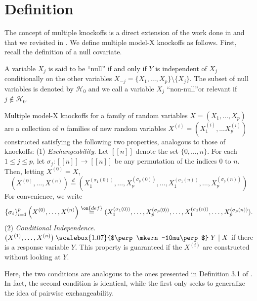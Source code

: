 \documentclass[11pt,reqno]{report}
\theoremstyle{definition}
\newcommand{\indep}{\mathrel{\text{\scalebox{1.07}{$\perp\mkern-10mu\perp$}}}}
\numberwithin{equation}{section}
\begin{document}
\section{Definition}
The concept of multiple knockoffs is a direct extension of the work done in \cite{knockoffs} and \cite{panning} that we revisited in . We define multiple model-X knockoffs as follows. First, recall the definition of a null covariate.
\begin{defn}
A variable $X_j$ is said to be ``null'' if and only if $Y$ is independent of $X_j$ conditionally on the other variables $X_{-j} = \{ X_1, \ldots, X_p \} \setminus \{ X_j\}$. The subset of null variables is denoted by $\mathcal{H}_0$ and we call a variable $X_j$ ``non-null''or relevant if $j \not \in \mathcal{H}_0$.
\end{defn}
\begin{defn}
Multiple model-X knockoffs for a family of random variables $X = (X_1, \ldots, X_p)$ are a collection of $n$ families of new random variables $X^{(i)} = (X^{(i)}_1, \ldots X^{(i)}_p)$ constructed satisfying the following two properties, analogous to those of knockoffs: (1) \emph{Exchangeability.} Let $[[n]]$ denote the set $\{ 0, \ldots, n \}$. For each $1 \leq j \leq p$, let $\sigma_j : [[n]] \to [[n]]$ be any permutation of the indices $0$ to $n$. Then, letting $X^{(0)} = X$,
\begin{equation}
(X^{(0)}, \ldots, X^{(n)}) \overset{d}= (X^{(\sigma_1(0))}_{1}, \ldots, X^{(\sigma_p(0))}_{p}, \ldots, X^{(\sigma_1(n))}_{1}, \ldots, X^{(\sigma_p(n))}_{p}  )
\end{equation}
For convenience, we write
\begin{equation}
\{ \sigma_i \}_{i=1}^p \left( X^{(0)}, \ldots, X^{(n)} \right) \overset{\on{def}}{=} (X^{(\sigma_1(0))}_{1}, \ldots, X^{(\sigma_p(0))}_{p}, \ldots, X^{(\sigma_1(n))}_{1}, \ldots, X^{(\sigma_p(n))}_{p}  ).
\end{equation}
(2) \emph{Conditional Independence.} $(X^{(1)}, \ldots, X^{(n)}) \indep Y \mid X$ if there is a response variable $Y$. This property is guaranteed if the $X^{(i)}$ are constructed without looking at $Y$.
\end{defn}
Here, the two conditions are analogous to the ones presented in Definition 3.1 of \cite{panning}. In fact, the second condition is identical, while the first only seeks to generalize the idea of pairwise exchangeability.
\end{document}
